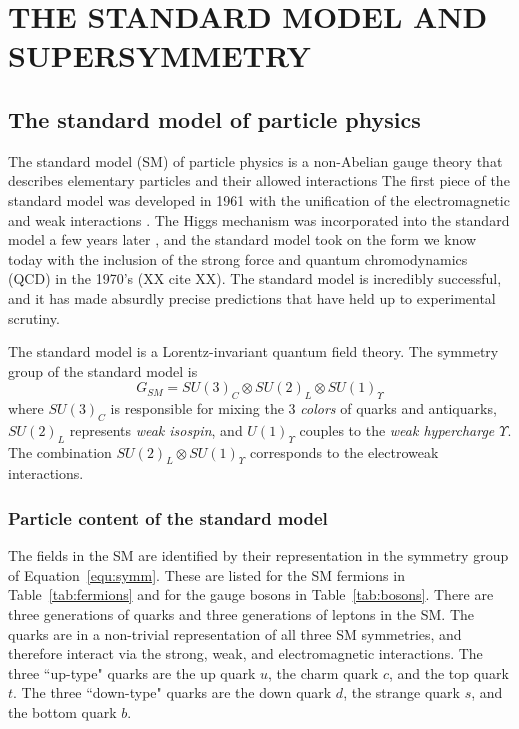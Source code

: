 \chapter{THE STANDARD MODEL AND SUPERSYMMETRY}
\label{chap:theory}

\section{The standard model of particle physics}
\label{sec:StandardModel}
The standard model (SM) of particle physics is a non-Abelian gauge theory that describes elementary particles and their allowed interactions
The first piece of the standard model was developed in 1961 with the unification of the electromagnetic and weak interactions 
\cite{GLASHOW1961579,Glashow:1970gm}. 
The Higgs mechanism was incorporated into the standard model a few years later 
\cite{PhysRev.127.965,PhysRevLett.13.508,PhysRevLett.13.321,Guralnik:1964eu}, and 
the standard model took on the form we know today with the inclusion of the strong force and quantum chromodynamics (QCD) in the 1970's (XX cite XX).
The standard model is incredibly successful, and it has made absurdly precise predictions that have held up to experimental scrutiny. 

The standard model is a Lorentz-invariant quantum field theory. The symmetry group of the standard model is 
\begin{equation}
G_{SM} = SU(3)_C \otimes SU(2)_L \otimes SU(1)_\Upsilon
\label{equ:symm}
\end{equation}
where $SU(3)_C$ is responsible for mixing the 3 \textit{colors} of quarks and antiquarks, $SU(2)_L$ represents \textit{weak isospin}, and $U(1)_\Upsilon$ couples to the \textit{weak hypercharge $\Upsilon$}. The combination $SU(2)_L \otimes SU(1)_\Upsilon$ corresponds to the electroweak interactions. 

\subsection{Particle content of the standard model}
\label{sec:SMparts}
The fields in the SM are identified by their representation in the symmetry group of Equation~\ref{equ:symm}. These are listed for the SM fermions in Table~\ref{tab:fermions} and for the gauge bosons in Table~\ref{tab:bosons}. There are three generations of quarks and three generations of leptons in the SM. The quarks are in a non-trivial representation of all three SM symmetries, and therefore interact via the strong, weak, and electromagnetic interactions. The three ``up-type" quarks are the up quark $u$, the charm quark $c$, and the top quark $t$. The three ``down-type" quarks are the down quark $d$, the strange quark $s$, and the bottom quark $b$. 


